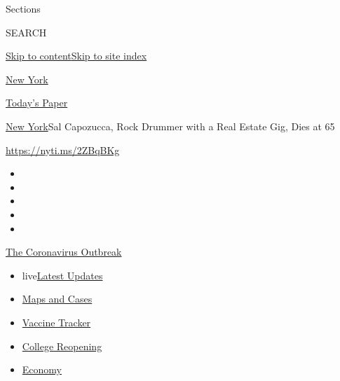 Sections

SEARCH

\protect\hyperlink{site-content}{Skip to
content}\protect\hyperlink{site-index}{Skip to site index}

\href{https://www.nytimes.com/section/nyregion}{New York}

\href{https://myaccount.nytimes.com/auth/login?response_type=cookie\&client_id=vi}{}

\href{https://www.nytimes.com/section/todayspaper}{Today's Paper}

\href{/section/nyregion}{New York}\textbar{}Sal Capozucca, Rock Drummer
with a Real Estate Gig, Dies at 65

\url{https://nyti.ms/2ZBqBKg}

\begin{itemize}
\item
\item
\item
\item
\item
\end{itemize}

\href{https://www.nytimes.com/news-event/coronavirus?action=click\&pgtype=Article\&state=default\&region=TOP_BANNER\&context=storylines_menu}{The
Coronavirus Outbreak}

\begin{itemize}
\tightlist
\item
  live\href{https://www.nytimes.com/2020/08/03/world/coronavirus-covid-19.html?action=click\&pgtype=Article\&state=default\&region=TOP_BANNER\&context=storylines_menu}{Latest
  Updates}
\item
  \href{https://www.nytimes.com/interactive/2020/us/coronavirus-us-cases.html?action=click\&pgtype=Article\&state=default\&region=TOP_BANNER\&context=storylines_menu}{Maps
  and Cases}
\item
  \href{https://www.nytimes.com/interactive/2020/science/coronavirus-vaccine-tracker.html?action=click\&pgtype=Article\&state=default\&region=TOP_BANNER\&context=storylines_menu}{Vaccine
  Tracker}
\item
  \href{https://www.nytimes.com/2020/08/02/us/covid-college-reopening.html?action=click\&pgtype=Article\&state=default\&region=TOP_BANNER\&context=storylines_menu}{College
  Reopening}
\item
  \href{https://www.nytimes.com/live/2020/08/03/business/stock-market-today-coronavirus?action=click\&pgtype=Article\&state=default\&region=TOP_BANNER\&context=storylines_menu}{Economy}
\end{itemize}

